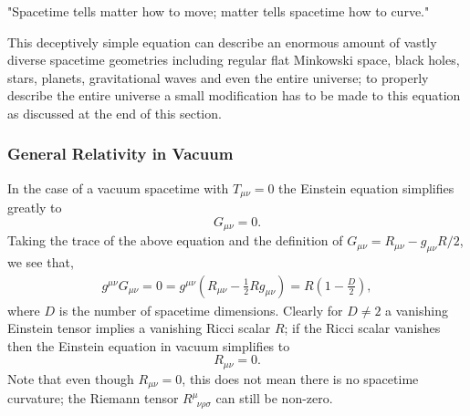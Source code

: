 {\it \begin{center}{"Spacetime tells matter how to move; matter tells spacetime how to curve."}\end{center} } 

This deceptively simple equation can describe an enormous amount of vastly diverse spacetime geometries including regular flat Minkowski space, black holes, stars, planets, gravitational waves and even the entire universe; to properly describe the entire universe a small modification has to be made to this equation as discussed at the end of this section. 



\subsubsection*{General Relativity in Vacuum}

In the case of a vacuum spacetime with $T_{\mu\nu}=0$ the Einstein equation simplifies greatly to
\begin{equation}G_{\mu\nu}=0.\end{equation}
Taking the trace of the above equation and the definition of $G_{\mu\nu}=R_{\mu\nu}-g_{\mu\nu}R/2$, we see that, 
\begin{align}
g^{\mu\nu}G_{\mu\nu}=0=g^{\mu\nu}\left(R_{\mu\nu}-\frac{1}{2}Rg_{\mu\nu}\right) = R\left(1-\frac{D}{2}\right),
\end{align}
where $D$ is the number of spacetime dimensions. Clearly for $D\neq 2$ a vanishing Einstein tensor implies a vanishing Ricci scalar $R$; if the Ricci scalar vanishes then the Einstein equation in vacuum simplifies to 
\begin{equation}
R_{\mu\nu} = 0.
\end{equation}
Note that even though $R_{\mu\nu}=0$, this does not mean there is no spacetime curvature; the Riemann tensor $R^\mu_{\,\,\,\nu\rho\sigma}$ can still be non-zero.


